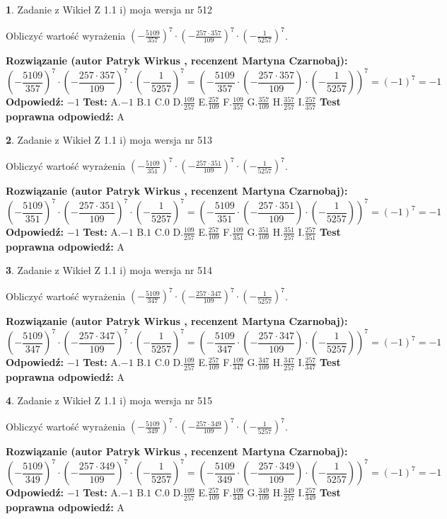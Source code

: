 \documentclass[12pt, a4paper]{article}
\theoremstyle{definition} %
\newtheorem{zad}{}
\newcommand{\zadStart}[1]{\begin{zad}#1\newline}
\newcommand{\zadStop}{\end{zad}}
\newcommand{\rozwStart}[2]{\noindent \textbf{Rozwiązanie (autor #1 , recenzent #2): }\newline}
\newcommand{\rozwStop}{\newline}
\newcommand{\odpStart}{\noindent \textbf{Odpowiedź:}\newline}
\newcommand{\odpStop}{\newline}
\newcommand{\testStart}{\noindent \textbf{Test:}\newline}
\newcommand{\testStop}{\newline}
\newcommand{\kluczStart}{\noindent \textbf{Test poprawna odpowiedź:}\newline}
\newcommand{\kluczStop}{\newline}
\begin{document}
\zadStart{Zadanie z Wikieł Z 1.1 i) moja wersja nr 512}

Obliczyć wartość wyrażenia $(-\frac{5109}{357})^{7} \cdot (-\frac{257 \cdot 357}{109})^{7} \cdot (-\frac{1}{5257})^{7}$.
\zadStop
\rozwStart{Patryk Wirkus}{Martyna Czarnobaj}
$$(-\frac{5109}{357})^{7} \cdot (-\frac{257 \cdot 357}{109})^{7} \cdot (-\frac{1}{5257})^{7} = (-\frac{5109}{357} \cdot (-\frac{257 \cdot 357}{109}) \cdot (-\frac{1}{5257}))^{7} = (-1)^{7} = -1$$
\rozwStop
\odpStart
$-1$
\odpStop
\testStart
A.$-1$ B.$1$ C.$0$ D.$\frac{109}{257}$ E.$\frac{257}{109}$
F.$\frac{109}{357}$ G.$\frac{357}{109}$
H.$\frac{357}{257}$
I.$\frac{257}{357}$
\testStop
\kluczStart
A
\kluczStop



\zadStart{Zadanie z Wikieł Z 1.1 i) moja wersja nr 513}

Obliczyć wartość wyrażenia $(-\frac{5109}{351})^{7} \cdot (-\frac{257 \cdot 351}{109})^{7} \cdot (-\frac{1}{5257})^{7}$.
\zadStop
\rozwStart{Patryk Wirkus}{Martyna Czarnobaj}
$$(-\frac{5109}{351})^{7} \cdot (-\frac{257 \cdot 351}{109})^{7} \cdot (-\frac{1}{5257})^{7} = (-\frac{5109}{351} \cdot (-\frac{257 \cdot 351}{109}) \cdot (-\frac{1}{5257}))^{7} = (-1)^{7} = -1$$
\rozwStop
\odpStart
$-1$
\odpStop
\testStart
A.$-1$ B.$1$ C.$0$ D.$\frac{109}{257}$ E.$\frac{257}{109}$
F.$\frac{109}{351}$ G.$\frac{351}{109}$
H.$\frac{351}{257}$
I.$\frac{257}{351}$
\testStop
\kluczStart
A
\kluczStop



\zadStart{Zadanie z Wikieł Z 1.1 i) moja wersja nr 514}

Obliczyć wartość wyrażenia $(-\frac{5109}{347})^{7} \cdot (-\frac{257 \cdot 347}{109})^{7} \cdot (-\frac{1}{5257})^{7}$.
\zadStop
\rozwStart{Patryk Wirkus}{Martyna Czarnobaj}
$$(-\frac{5109}{347})^{7} \cdot (-\frac{257 \cdot 347}{109})^{7} \cdot (-\frac{1}{5257})^{7} = (-\frac{5109}{347} \cdot (-\frac{257 \cdot 347}{109}) \cdot (-\frac{1}{5257}))^{7} = (-1)^{7} = -1$$
\rozwStop
\odpStart
$-1$
\odpStop
\testStart
A.$-1$ B.$1$ C.$0$ D.$\frac{109}{257}$ E.$\frac{257}{109}$
F.$\frac{109}{347}$ G.$\frac{347}{109}$
H.$\frac{347}{257}$
I.$\frac{257}{347}$
\testStop
\kluczStart
A
\kluczStop



\zadStart{Zadanie z Wikieł Z 1.1 i) moja wersja nr 515}

Obliczyć wartość wyrażenia $(-\frac{5109}{349})^{7} \cdot (-\frac{257 \cdot 349}{109})^{7} \cdot (-\frac{1}{5257})^{7}$.
\zadStop
\rozwStart{Patryk Wirkus}{Martyna Czarnobaj}
$$(-\frac{5109}{349})^{7} \cdot (-\frac{257 \cdot 349}{109})^{7} \cdot (-\frac{1}{5257})^{7} = (-\frac{5109}{349} \cdot (-\frac{257 \cdot 349}{109}) \cdot (-\frac{1}{5257}))^{7} = (-1)^{7} = -1$$
\rozwStop
\odpStart
$-1$
\odpStop
\testStart
A.$-1$ B.$1$ C.$0$ D.$\frac{109}{257}$ E.$\frac{257}{109}$
F.$\frac{109}{349}$ G.$\frac{349}{109}$
H.$\frac{349}{257}$
I.$\frac{257}{349}$
\testStop
\kluczStart
A
\kluczStop
\end{document}
